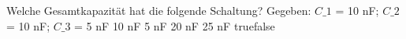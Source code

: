     {Welche Gesamtkapazität hat die folgende Schaltung? Gegeben: $C\_1$ = 10 nF; $C\_2$ = 10 nF; $C\_3$ = 5 nF}
    {10 nF}
    {5 nF}
    {20 nF}
    {25 nF}
    {true}{false}